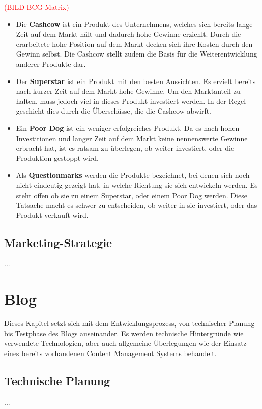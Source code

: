   \textcolor{red}{(BILD BCG-Matrix)}

  \begin{itemize}
    \item Die \textbf{Cashcow} ist ein Produkt des Unternehmens, welches sich bereits lange Zeit auf dem Markt hält und dadurch hohe Gewinne erziehlt. Durch die
    erarbeitete hohe Position auf dem Markt decken sich ihre Kosten durch den Gewinn selbst. Die Cashcow stellt zudem die Basis für die Weiterentwicklung anderer
    Produkte dar.

    \item Der \textbf{Superstar} ist ein Produkt mit den besten Aussichten. Es erzielt bereits nach kurzer Zeit auf dem Markt hohe Gewinne. Um den Marktanteil
    zu halten, muss jedoch viel in dieses Produkt investiert werden. In der Regel geschieht dies durch die Überschüsse, die die Cashcow abwirft.

    \item Ein \textbf{Poor Dog} ist ein weniger erfolgreiches Produkt. Da es nach hohen Investitionen und langer Zeit auf dem Markt keine nennenswerte
    Gewinne erbracht hat, ist es ratsam zu überlegen, ob weiter investiert, oder die Produktion gestoppt wird.

    \item Als \textbf{Questionmarks} werden die Produkte bezeichnet, bei denen sich noch nicht eindeutig gezeigt hat, in welche Richtung sie sich entwickeln werden.
    Es steht offen ob sie zu einem Superstar, oder einem Poor Dog werden. Diese Tatsache macht es schwer zu entscheiden, ob weiter in sie investiert, oder das Produkt
    verkauft wird.
  \end{itemize}

  \subsection{Marketing-Strategie}
  ...

\section{Blog}
Dieses Kapitel setzt sich mit dem Entwicklungsprozess, von technischer Planung bis Testphase
des Blogs auseinander. Es werden technische Hintergründe wie verwendete Technologien, aber
auch allgemeine Überlegungen wie der Einsatz eines bereits vorhandenen Content Management Systems
behandelt.
  \subsection{Technische Planung}
  ...

